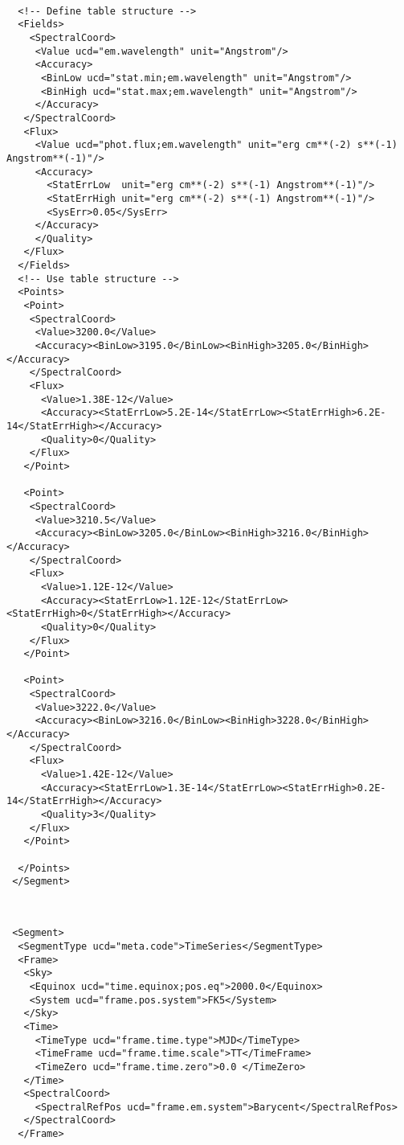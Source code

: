 \documentclass[11pt]{article}
\newenvironment{fmpage}
     {\begin{lrbox}{\fmbox}\begin{minipage}{6.5in}}
     {\end{minipage}\end{lrbox}\colorbox{iblue}{\fbox{\usebox{\fmbox}}}}
\begin{document}
{\begin{flushleft}
\begin{fmpage}
\begin{verbatim}

  <!-- Define table structure -->
  <Fields>
    <SpectralCoord>
     <Value ucd="em.wavelength" unit="Angstrom"/>    
     <Accuracy>
      <BinLow ucd="stat.min;em.wavelength" unit="Angstrom"/> 
      <BinHigh ucd="stat.max;em.wavelength" unit="Angstrom"/>
     </Accuracy>
   </SpectralCoord>
   <Flux>
     <Value ucd="phot.flux;em.wavelength" unit="erg cm**(-2) s**(-1) Angstrom**(-1)"/>
     <Accuracy>
       <StatErrLow  unit="erg cm**(-2) s**(-1) Angstrom**(-1)"/>
       <StatErrHigh unit="erg cm**(-2) s**(-1) Angstrom**(-1)"/>
       <SysErr>0.05</SysErr>
     </Accuracy>
     </Quality>
   </Flux>
  </Fields>
  <!-- Use table structure -->
  <Points>
   <Point> 
    <SpectralCoord>
     <Value>3200.0</Value>
     <Accuracy><BinLow>3195.0</BinLow><BinHigh>3205.0</BinHigh></Accuracy>
    </SpectralCoord>
    <Flux>
      <Value>1.38E-12</Value>
      <Accuracy><StatErrLow>5.2E-14</StatErrLow><StatErrHigh>6.2E-14</StatErrHigh></Accuracy>
      <Quality>0</Quality>
    </Flux>
   </Point>

   <Point> 
    <SpectralCoord>
     <Value>3210.5</Value>
     <Accuracy><BinLow>3205.0</BinLow><BinHigh>3216.0</BinHigh></Accuracy>
    </SpectralCoord>
    <Flux>
      <Value>1.12E-12</Value>
      <Accuracy><StatErrLow>1.12E-12</StatErrLow><StatErrHigh>0</StatErrHigh></Accuracy>
      <Quality>0</Quality>
    </Flux>
   </Point>

   <Point> 
    <SpectralCoord>
     <Value>3222.0</Value>
     <Accuracy><BinLow>3216.0</BinLow><BinHigh>3228.0</BinHigh></Accuracy>
    </SpectralCoord>
    <Flux>
      <Value>1.42E-12</Value>
      <Accuracy><StatErrLow>1.3E-14</StatErrLow><StatErrHigh>0.2E-14</StatErrHigh></Accuracy>
      <Quality>3</Quality>
    </Flux>
   </Point>

  </Points>
 </Segment>

\end{verbatim}
\end{fmpage}

\begin{fmpage}
\begin{verbatim}


 <Segment>
  <SegmentType ucd="meta.code">TimeSeries</SegmentType>
  <Frame>
   <Sky>
    <Equinox ucd="time.equinox;pos.eq">2000.0</Equinox>
    <System ucd="frame.pos.system">FK5</System>
   </Sky>
   <Time>
     <TimeType ucd="frame.time.type">MJD</TimeType> 
     <TimeFrame ucd="frame.time.scale">TT</TimeFrame> 
     <TimeZero ucd="frame.time.zero">0.0 </TimeZero>
   </Time>
   <SpectralCoord>
     <SpectralRefPos ucd="frame.em.system">Barycent</SpectralRefPos>
   </SpectralCoord>
  </Frame>


\end{verbatim}
\end{fmpage}
\end{flushleft}}
\end{document}
